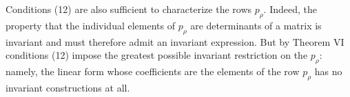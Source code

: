 \documentclass[10pt]{article}
\begin{document}
Conditions (12) are also sufficient to characterize the rows $p_\rho$. Indeed, the property that the individual elements of $p_\rho$ are determinants of a matrix is invariant and must therefore admit an invariant expression. But by Theorem VI conditions (12) impose the greatest possible invariant restriction on the $p_\rho$: namely, the linear form whose coefficients are the elements of the row $p_\rho$ has no invariant constructions at all.
\end{document}
